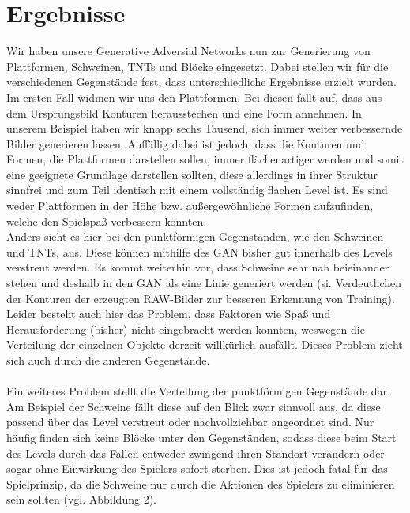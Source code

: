 
\section{Ergebnisse}
Wir haben unsere Generative Adversial Networks nun zur Generierung von Plattformen, Schweinen, TNTs und Blöcke eingesetzt. Dabei stellen wir für die verschiedenen Gegenstände fest, dass unterschiedliche Ergebnisse erzielt wurden. Im ersten Fall widmen wir uns den Plattformen. Bei diesen fällt auf, dass aus dem Ursprungsbild Konturen herausstechen und eine Form annehmen. In unserem Beispiel haben wir knapp sechs Tausend, sich immer weiter verbessernde Bilder generieren lassen. Auffällig dabei ist jedoch, dass die Konturen und Formen, die Plattformen darstellen sollen, immer flächenartiger werden und somit eine geeignete Grundlage darstellen sollten, diese allerdings in ihrer Struktur sinnfrei und zum Teil identisch mit einem vollständig flachen Level ist. Es sind weder Plattformen in der Höhe bzw. außergewöhnliche Formen aufzufinden, welche den Spielspaß verbessern könnten. \\ Anders sieht es hier bei den punktförmigen Gegenständen, wie den Schweinen und TNTs, aus. Diese können mithilfe des GAN bisher gut innerhalb des Levels verstreut werden. Es kommt weiterhin vor, dass Schweine sehr nah beieinander stehen und deshalb in den GAN als eine Linie generiert werden (si. Verdeutlichen der Konturen der erzeugten RAW-Bilder zur besseren Erkennung von Training). \\Leider besteht auch hier das Problem, dass Faktoren wie Spaß und Herausforderung (bisher) nicht eingebracht werden konnten, weswegen die Verteilung der einzelnen Objekte derzeit willkürlich ausfällt. Dieses Problem zieht sich auch durch die anderen Gegenstände. \\ \\Ein weiteres Problem stellt die Verteilung der punktförmigen Gegenstände dar. Am Beispiel der Schweine fällt diese auf den Blick zwar sinnvoll aus, da diese passend über das Level verstreut oder nachvollziehbar angeordnet sind. Nur häufig finden sich keine Blöcke unter den Gegenständen, sodass diese beim Start des Levels durch das Fallen entweder zwingend ihren Standort verändern oder sogar ohne Einwirkung des Spielers sofort sterben. Dies ist jedoch fatal für das Spielprinzip, da die Schweine nur durch die Aktionen des Spielers zu eliminieren sein sollten (vgl. Abbildung 2).
